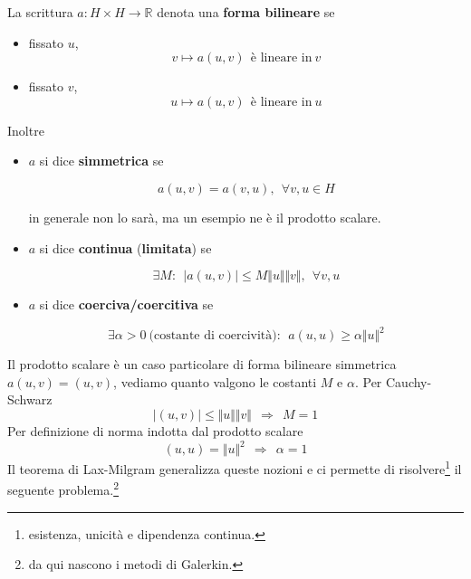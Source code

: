 \documentclass[10pt,a4paper,twoside,openright]{book}
\begin{document}
\begin{definition}
La scrittura $a:H\times H\rightarrow \mathbb{R}$ denota una \textbf{forma bilineare} se
\begin{itemize}
\item fissato $u$,\begin{equation*}
v\mapsto a(u,v) \ \ \text{è lineare in} \ v
\end{equation*}
\item fissato $v$,\begin{equation*}
u\mapsto a(u,v) \ \ \text{è lineare in} \ u
\end{equation*}
\end{itemize}
\end{definition}
\begin{definition}
Inoltre
\begin{itemize}
\item $a$ si dice \textbf{simmetrica} se

\begin{equation*}
a(u,v) =a(v,u),\ \ \forall v,u\in H
\end{equation*}

in generale non lo sarà, ma un esempio ne è il prodotto scalare.
\item $a$ si dice \textbf{continua} (\textbf{limitata}) se

\begin{equation*}
\exists M:\ \ | a(u,v)| \leqslant M\Vert u\Vert \Vert v\Vert,\ \ \forall v,u
\end{equation*}
\item $a$ si dice \textbf{coerciva/coercitiva} se

\begin{equation*}
\exists \alpha  >0\ \text{(costante di coercività)} :\ \ a(u,u) \geqslant \alpha \Vert u\Vert ^{2}
\end{equation*}
\end{itemize}
\end{definition}
Il prodotto scalare è un caso particolare di forma bilineare simmetrica $a(u,v) =(u,v)$, vediamo quanto valgono le costanti $M$ e $\alpha $. Per Cauchy-Schwarz
\begin{equation*}
| (u,v)| \leqslant \Vert u\Vert \Vert v\Vert \ \ \Rightarrow \ \ M=1
\end{equation*}
Per definizione di norma indotta dal prodotto scalare
\begin{equation*}
(u,u) =\Vert u\Vert ^{2} \ \ \Rightarrow \ \ \alpha =1
\end{equation*}
Il teorema di Lax-Milgram generalizza queste nozioni e ci permette di risolvere\footnote{esistenza, unicità e dipendenza continua.} il seguente problema.\footnote{da qui nascono i metodi di Galerkin.}
\end{document}
